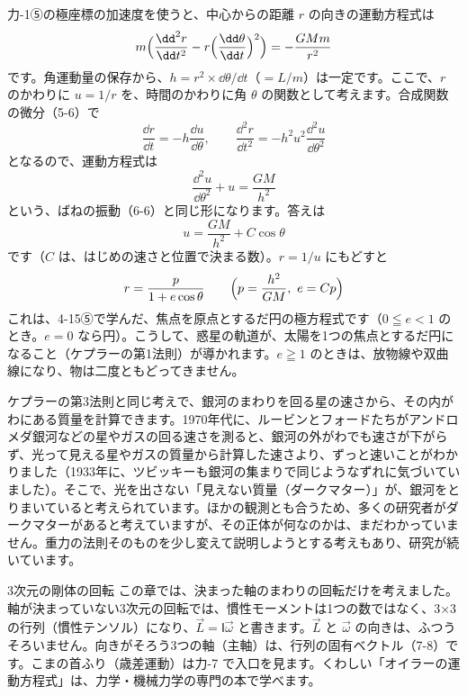 \begin{motto}[4]
\label{ph:力-6:kepler1}力-1⑤の極座標の加速度を使うと、中心からの距離 $r$ の向きの運動方程式は
\[ m\Bigl(\frac{\dd^2r}{\dd t^2}-r\Bigl(\frac{\dd\theta}{\dd t}\Bigr)^2\Bigr)=-\frac{GMm}{r^2} \]
です。角運動量の保存から、$h=r^2\times\dd\theta/\dd t$（$=L/m$）は一定です。ここで、$r$ のかわりに $u=1/r$ を、時間のかわりに角 $\theta$ の関数として考えます。合成関数の微分（5-6）で
\[ \frac{\dd r}{\dd t}=-h\frac{\dd u}{\dd\theta},\qquad\frac{\dd^2r}{\dd t^2}=-h^2u^2\frac{\dd^2u}{\dd\theta^2} \]
となるので、運動方程式は
\[ \frac{\dd^2u}{\dd\theta^2}+u=\frac{GM}{h^2} \]
という、ばねの振動（6-6）と同じ形になります。答えは
\[ u=\frac{GM}{h^2}+C\cos\theta \]
です（$C$ は、はじめの速さと位置で決まる数）。$r=1/u$ にもどすと
\[ r=\frac{p}{1+e\cos\theta}\qquad\Bigl(p=\frac{h^2}{GM},\ e=Cp\Bigr) \]
これは、4-15⑤で学んだ、焦点を原点とするだ円の極方程式です（$0\leqq e<1$ のとき。$e=0$ なら円）。こうして、惑星の軌道が、太陽を1つの焦点とするだ円になること（ケプラーの第1法則）が導かれます。$e\geqq1$ のときは、放物線や双曲線になり、物は二度ともどってきません。
\end{motto}

\begin{phmada}
ケプラーの第3法則と同じ考えで、銀河のまわりを回る星の速さから、その内がわにある質量を計算できます。1970年代に、ルービンとフォードたちがアンドロメダ銀河などの星やガスの回る速さを測ると、銀河の外がわでも速さが下がらず、光って見える星やガスの質量から計算した速さより、ずっと速いことがわかりました（1933年に、ツビッキーも銀河の集まりで同じようなずれに気づいていました）。そこで、光を出さない「見えない質量（ダークマター）」が、銀河をとりまいていると考えられています。ほかの観測とも合うため、多くの研究者がダークマターがあると考えていますが、その正体が何なのかは、まだわかっていません。重力の法則そのものを少し変えて説明しようとする考えもあり、研究が続いています。
\end{phmada}

\begin{phsaki}{3次元の剛体の回転}
この章では、決まった軸のまわりの回転だけを考えました。軸が決まっていない3次元の回転では、慣性モーメントは1つの数ではなく、3×3の行列（慣性テンソル）になり、$\vec L=\mathsf I\vec\omega$ と書きます。$\vec L$ と $\vec\omega$ の向きは、ふつうそろいません。向きがそろう3つの軸（主軸）は、行列の固有ベクトル（7-8）です。こまの首ふり（歳差運動）は力-7 で入口を見ます。くわしい「オイラーの運動方程式」は、力学・機械力学の専門の本で学べます。
\end{phsaki}

